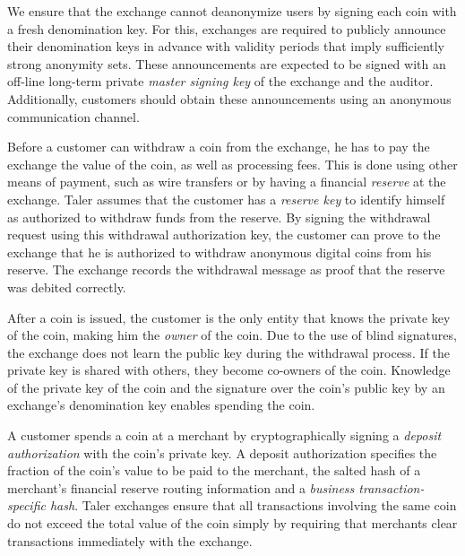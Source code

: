 \documentclass{llncs}
\begin{document}
We ensure that the exchange cannot deanonymize users by signing
each coin with a fresh denomination key.  For this, exchanges are
required to publicly announce their denomination keys in advance
with validity periods that imply sufficiently strong anonymity sets.
These announcements are expected to be signed with an off-line
long-term private {\em master signing key} of the exchange and the
auditor.  Additionally, customers should obtain these announcements
using an anonymous communication channel.

Before a customer can withdraw a coin from the exchange, he has to pay
the exchange the value of the coin, as well as processing fees.  This
is done using other means of payment, such as wire transfers or by
having a financial {\em reserve} at the exchange.  Taler assumes that
the customer has a {\em reserve key} to identify
himself as authorized to withdraw funds from the reserve.  By signing
the withdrawal request using this withdrawal authorization key, the
customer can prove to the exchange that he is authorized to withdraw
anonymous digital coins from his reserve.  The exchange records the
withdrawal message as proof that the reserve was debited correctly.


After a coin is issued, the customer is the only entity that knows the
private key of the coin, making him the \emph{owner} of the coin.  Due
to the use of blind signatures, the exchange does not learn the
public key during the withdrawal process.  If the private key is
shared with others, they become co-owners of the coin.  Knowledge of
the private key of the coin and the signature over the coin's public
key by an exchange's denomination key enables spending the
coin.



A customer spends a coin at a merchant by cryptographically signing a
{\em deposit authorization} with the coin's private key.  A deposit
authorization specifies the fraction of the coin's value to be paid to
the merchant, the salted hash of a merchant's financial reserve
routing information and a {\em business transaction-specific hash}.
Taler exchanges ensure that all transactions involving the same coin
do not exceed the total value of the coin simply by requiring that
merchants clear transactions immediately with the exchange.
\end{document}
